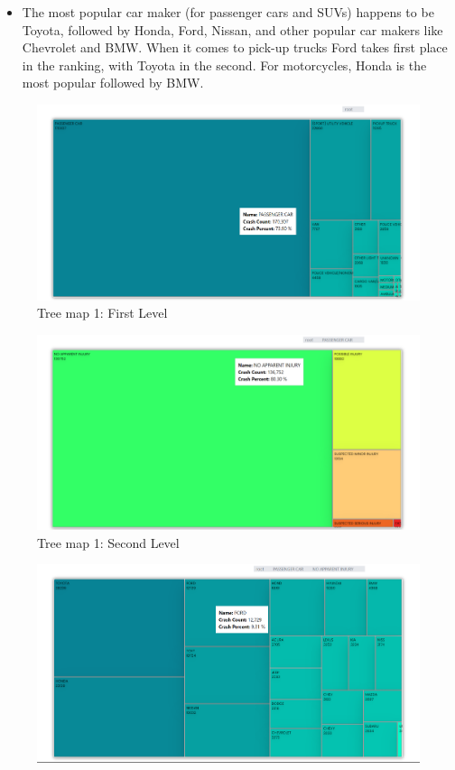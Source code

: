 \documentclass[conference]{IEEEtran}
\begin{document}
\begin{enumerate}
\begin{enumerate}
\begin{itemize}
    \item The most popular car maker (for passenger cars and SUVs) happens to be Toyota, followed by Honda, Ford, Nissan, and other popular car makers like Chevrolet and BMW. When it comes to pick-up trucks Ford takes first place in the ranking, with Toyota in the second. For motorcycles, Honda is the most popular followed by BMW.
    
    \end{itemize}
    
    \begin{figure}
        \centering
        \includegraphics[width=1\linewidth]{tree-map1_level1.png}
        \caption{Tree map 1: First Level }
        \label{fig:enter-label}
    \end{figure}
    \begin{figure}
        \centering
        \includegraphics[width=1\linewidth]{tree-map1_level2.png}
        \caption{Tree map 1: Second Level }
        \label{fig:enter-label}
    \end{figure}
    \begin{figure}
        \centering
        \includegraphics[width=1\linewidth]{tree-map1_level3.png}

\end{figure}
\end{enumerate}
\end{enumerate}
\end{document}
